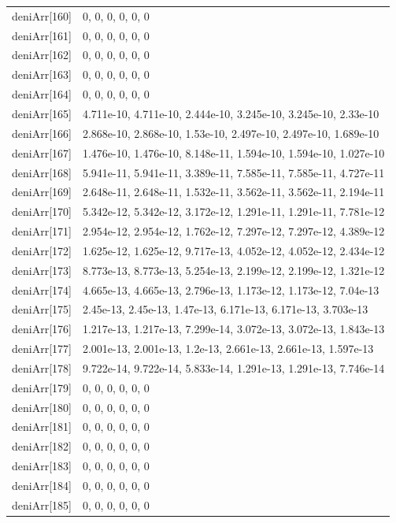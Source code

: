 {\begin{longtable}{p{}p{}}
{}deniArr[160] & 0, 0, 0, 0, 0, 0\\
{}deniArr[161] & 0, 0, 0, 0, 0, 0\\
{}deniArr[162] & 0, 0, 0, 0, 0, 0\\
{}deniArr[163] & 0, 0, 0, 0, 0, 0\\
{}deniArr[164] & 0, 0, 0, 0, 0, 0\\
{}deniArr[165] & 4.711e-10, 4.711e-10, 2.444e-10, 3.245e-10, 3.245e-10, 2.33e-10\\
{}deniArr[166] & 2.868e-10, 2.868e-10, 1.53e-10, 2.497e-10, 2.497e-10, 1.689e-10\\
{}deniArr[167] & 1.476e-10, 1.476e-10, 8.148e-11, 1.594e-10, 1.594e-10, 1.027e-10\\
{}deniArr[168] & 5.941e-11, 5.941e-11, 3.389e-11, 7.585e-11, 7.585e-11, 4.727e-11\\
{}deniArr[169] & 2.648e-11, 2.648e-11, 1.532e-11, 3.562e-11, 3.562e-11, 2.194e-11\\
{}deniArr[170] & 5.342e-12, 5.342e-12, 3.172e-12, 1.291e-11, 1.291e-11, 7.781e-12\\
{}deniArr[171] & 2.954e-12, 2.954e-12, 1.762e-12, 7.297e-12, 7.297e-12, 4.389e-12\\
{}deniArr[172] & 1.625e-12, 1.625e-12, 9.717e-13, 4.052e-12, 4.052e-12, 2.434e-12\\
{}deniArr[173] & 8.773e-13, 8.773e-13, 5.254e-13, 2.199e-12, 2.199e-12, 1.321e-12\\
{}deniArr[174] & 4.665e-13, 4.665e-13, 2.796e-13, 1.173e-12, 1.173e-12, 7.04e-13\\
{}deniArr[175] & 2.45e-13, 2.45e-13, 1.47e-13, 6.171e-13, 6.171e-13, 3.703e-13\\
{}deniArr[176] & 1.217e-13, 1.217e-13, 7.299e-14, 3.072e-13, 3.072e-13, 1.843e-13\\
{}deniArr[177] & 2.001e-13, 2.001e-13, 1.2e-13, 2.661e-13, 2.661e-13, 1.597e-13\\
{}deniArr[178] & 9.722e-14, 9.722e-14, 5.833e-14, 1.291e-13, 1.291e-13, 7.746e-14\\
{}deniArr[179] & 0, 0, 0, 0, 0, 0\\
{}deniArr[180] & 0, 0, 0, 0, 0, 0\\
{}deniArr[181] & 0, 0, 0, 0, 0, 0\\
{}deniArr[182] & 0, 0, 0, 0, 0, 0\\
{}deniArr[183] & 0, 0, 0, 0, 0, 0\\
{}deniArr[184] & 0, 0, 0, 0, 0, 0\\
{}deniArr[185] & 0, 0, 0, 0, 0, 0\\

\end{longtable}}
